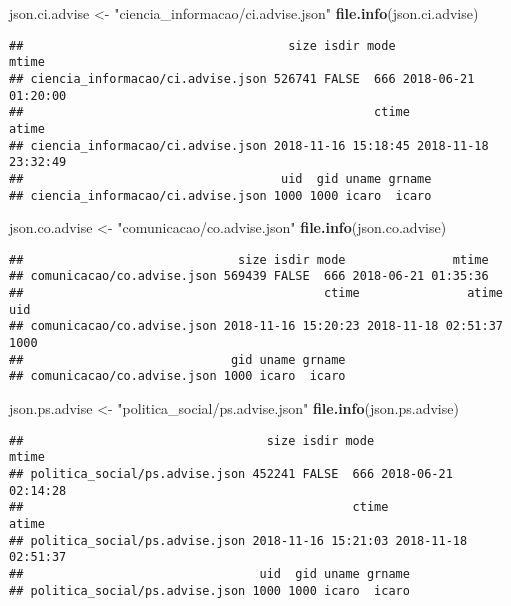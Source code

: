 \documentclass[]{article}
\newenvironment{Shaded}{\begin{snugshade}}{\end{snugshade}}
\newcommand{\KeywordTok}[1]{\textcolor[rgb]{0.13,0.29,0.53}{\textbf{#1}}}
\newcommand{\StringTok}[1]{\textcolor[rgb]{0.31,0.60,0.02}{#1}}
\newcommand{\NormalTok}[1]{#1}
\begin{document}
\begin{Shaded}
\begin{Highlighting}[]
\NormalTok{json.ci.advise <-}\StringTok{ "ciencia_informacao/ci.advise.json"}
\KeywordTok{file.info}\NormalTok{(json.ci.advise)}
\end{Highlighting}
\end{Shaded}

\begin{verbatim}
##                                     size isdir mode               mtime
## ciencia_informacao/ci.advise.json 526741 FALSE  666 2018-06-21 01:20:00
##                                                 ctime               atime
## ciencia_informacao/ci.advise.json 2018-11-16 15:18:45 2018-11-18 23:32:49
##                                    uid  gid uname grname
## ciencia_informacao/ci.advise.json 1000 1000 icaro  icaro
\end{verbatim}

\begin{Shaded}
\begin{Highlighting}[]
\NormalTok{json.co.advise <-}\StringTok{ "comunicacao/co.advise.json"}
\KeywordTok{file.info}\NormalTok{(json.co.advise)}
\end{Highlighting}
\end{Shaded}

\begin{verbatim}
##                              size isdir mode               mtime
## comunicacao/co.advise.json 569439 FALSE  666 2018-06-21 01:35:36
##                                          ctime               atime  uid
## comunicacao/co.advise.json 2018-11-16 15:20:23 2018-11-18 02:51:37 1000
##                             gid uname grname
## comunicacao/co.advise.json 1000 icaro  icaro
\end{verbatim}

\begin{Shaded}
\begin{Highlighting}[]
\NormalTok{json.ps.advise <-}\StringTok{ "politica_social/ps.advise.json"}
\KeywordTok{file.info}\NormalTok{(json.ps.advise)}
\end{Highlighting}
\end{Shaded}

\begin{verbatim}
##                                  size isdir mode               mtime
## politica_social/ps.advise.json 452241 FALSE  666 2018-06-21 02:14:28
##                                              ctime               atime
## politica_social/ps.advise.json 2018-11-16 15:21:03 2018-11-18 02:51:37
##                                 uid  gid uname grname
## politica_social/ps.advise.json 1000 1000 icaro  icaro
\end{verbatim}
\end{document}
